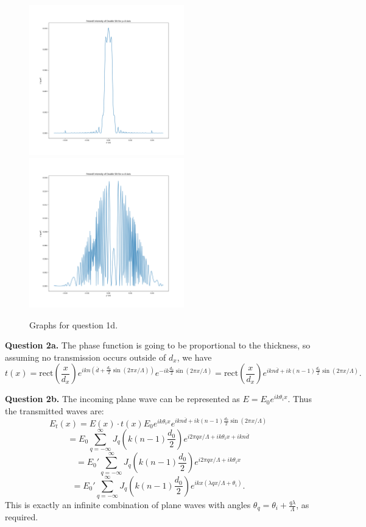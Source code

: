 \documentclass[letterpaper, reqno,11pt]{article}
\begin{document}
\begin{figure}[htpb]
    \centering
    \includegraphics[width=0.6\textwidth]{q1dx}
    \includegraphics[width=0.6\textwidth]{q1dy}
    \caption{Graphs for question 1d.}
    \label{fig:q1b}
\end{figure}


{\medskip\noindent\bf Question 2a.} The phase function is going to be proportional to the thickness, so assuming no transmission occurs outside of $d_x$, we have
\[
t(x) = \text{rect}\left(\frac{x}{d_x}\right)e^{ikn\left(\overline{d}+\frac{d_0}{2}\sin(2\pi x /\Lambda)\right)}e^{-ik \frac{d_0}{2}\sin\left( 2\pi x /\Lambda \right) }=\text{rect}\left(\frac{x}{d_x}\right)e^{ikn\overline{d}+ik(n-1)\frac{d_0}{2}\sin(2\pi x /\Lambda)}
.\]

{\medskip\noindent\bf Question 2b.} The incoming plane wave can be represented as $E=E_0 e^{ik\theta_i x}$. Thus the transmitted waves are:
\[
E_t(x)=E(x)\cdot t(x)E_0 e^{ik\theta_i x} e^{ikn\overline{d}+ik(n-1)\frac{d_0}{2}\sin(2\pi x /\Lambda)}
\]
\[
=E_0\sum_{q=-\infty}^{\infty}J_q\left(k(n-1) \frac{d_0}{2}\right)e^{i 2\pi qx /\Lambda+ik\theta_ix+ikn\overline{d}}
\]
\[
=E_0'\sum_{q=-\infty}^{\infty}J_q\left(k(n-1) \frac{d_0}{2}\right)e^{i 2\pi qx /\Lambda+ik\theta_ix} 
\]
\[
=E_0'\sum_{q=-\infty}^{\infty}J_q\left(k(n-1) \frac{d_0}{2}\right)e^{ikx(\lambda qx /\Lambda+\theta_i)} 
.\]
This is exactly an infinite combination of plane waves with angles $\theta_q=\theta_i+\frac{q\lambda}{\Lambda}$, as required.
\end{document}
